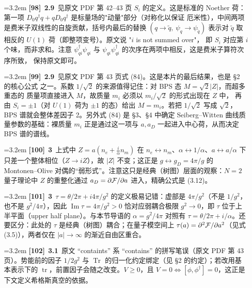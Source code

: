 \par
\par\medskip\noindent\hangindent=3.2em \textbf{[98]}~\textbf{2.9}~见原文 PDF 第 42--43 页 $S_i$ 的定义。这是标准的 Noether 荷： 第一项 $D_0q^\dagger q+qD_0q^\dagger$ 是标量场的"动量"部分（对称化以保证 厄米性），中间两项是费米子双线性的自旋贡献，括号内最后的替换 $(q\to\widetilde q,\ \psi_q\to\psi_{\widetilde q})$ 表示对 $\widetilde q$ 取相反的 $U(1)$ 荷（即整项变号）。原文说 "$i$ is not summed over"， 即 $S_i$ 对应第 $i$ 个味，而非求和。注意 $\psi^\dagger_{qi}\psi_{qi}$ 与 $\psi_{qi}\psi^\dagger_{qi}$ 的次序在两项中相反，这是费米子算符次序所致， 保持原文即可。
\par
\par\medskip\noindent\hangindent=3.2em \textbf{[99]}~\textbf{2.9}~见原文 PDF 第 43 页式 (84)。这是本片的最后结果，也是 §2 的核心公式 之一。系数 $1/\sqrt2$ 的来源值得记住：对 BPS 态 $M=\sqrt2|Z|$，而超多重态的 质量项直接进入 $M$，故质量 $m_i$ 必须以 $m_i/\sqrt2$ 的形式出现在 $Z$ 中， 再由 $S_i=\pm1$（对 $U(1)$ 荷为 $\pm1$ 的态）给出 $M=m_i$。若把 $1/\sqrt2$ 写成 $\sqrt2$，BPS 谱就会整体差因子 2。另外式 (84) 是 §3、§4 中确定 Seiberg--Witten 曲线质量参数的基础：裸质量 $m_i$ 正是通过这一项与 $a,a_D$ 一起进入中心荷，从而决定 BPS 谱的谱线。
\par
\par\medskip\noindent\hangindent=3.2em \textbf{[100]}~\textbf{3}~上式中 $Z=a(n_e+\frac{i}{\alpha}n_m)$ 在 $n_e\leftrightarrow n_m$、$\alpha\leftrightarrow1/\alpha$、$a\leftrightarrow a/\alpha$ 下只差一个整体相位（$Z\to iZ$），故 $|Z|$ 不变；这正是 $g\leftrightarrow g_D=4\pi/g$ 的 Montonen--Olive 对偶的“弱形式”。注意这只是经典（树图）层面的观察：$N=2$ 量子理论中 $Z$ 的重整化通过 $a_D=\partial{\cal F}/\partial a$ 进入，精确公式是 (3.12)。
\par
\par\medskip\noindent\hangindent=3.2em \textbf{[101]}~\textbf{3}~$\tau=\theta/2\pi+i4\pi/g^2$ 的定义极易记错：虚部是 $4\pi/g^2$（不是 $1/g^2$，也不是 $g^2/4\pi$），因此 $\operatorname{Im}\tau=4\pi/g^2>0$ 恰对应弱耦合极限 $g^2\to0$，即 $\tau$ 位于上半平面（upper half plane）。与本节导语的 $\alpha=g^2/4\pi$ 对照有 $\tau=\theta/2\pi+i/\alpha$。还要区分：此处的 $\tau$ 是经典（树图）耦合；在量子模空间上 $\tau(a)=\partial^2{\cal F}/\partial a^2$（见式 (3.5)），两者仅在 $|a|\to\infty$ 的渐近自由区重合。
\par
\par\medskip\noindent\hangindent=3.2em \textbf{[102]}~\textbf{3.1}~原文 “containts” 系 “contains” 的拼写笔误（原文 PDF 第 43 页）。势能前的因子 $1/2g^2$ 与 $\operatorname{Tr}$ 的归一化约定绑定（见 §2 的约定）；若改用基本表示下的 $\operatorname{tr}$，前置因子会随之改变。$V\geq0$，且 $V=0\iff[\phi,\phi^\dagger]=0$，这正是下文定义希格斯真空的依据。
